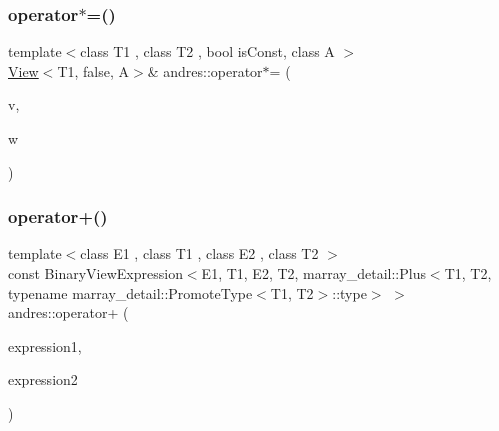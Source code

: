 \mbox{\label{namespaceandres_a766484f5dd8163c93e833b6438a49f1e}} 
\subsubsection{\texorpdfstring{operator$\ast$=()}{operator*=()}}
{\footnotesize\ttfamily template$<$class T1 , class T2 , bool is\+Const, class A $>$ \\
\hyperlink{classandres_1_1View}{View}$<$T1, false, A$>$\& andres\+::operator$\ast$= (\begin{DoxyParamCaption}\item[{\hyperlink{classandres_1_1View}{View}$<$ T1, false, A $>$ \&}]{v,  }\item[{const \hyperlink{classandres_1_1View}{View}$<$ T2, is\+Const, A $>$ \&}]{w }\end{DoxyParamCaption})\hspace{0.3cm}{\ttfamily [inline]}}

\mbox{\label{namespaceandres_a43eb4a16a1f776bc81a7f58fa93a0c71}} 
\subsubsection{\texorpdfstring{operator+()}{operator+()}\hspace{0.1cm}{\footnotesize\ttfamily [1/2]}}
{\footnotesize\ttfamily template$<$class E1 , class T1 , class E2 , class T2 $>$ \\
const Binary\+View\+Expression$<$E1, T1, E2, T2, marray\+\_\+detail\+::\+Plus$<$T1, T2, typename marray\+\_\+detail\+::\+Promote\+Type$<$T1, T2$>$\+::type$>$ $>$ andres\+::operator+ (\begin{DoxyParamCaption}\item[{const \hyperlink{classandres_1_1ViewExpression}{View\+Expression}$<$ E1, T1 $>$ \&}]{expression1,  }\item[{const \hyperlink{classandres_1_1ViewExpression}{View\+Expression}$<$ E2, T2 $>$ \&}]{expression2 }\end{DoxyParamCaption})\hspace{0.3cm}{\ttfamily [inline]}}

\mbox{\label{namespaceandres_af0a5caf93e8476b870c5f3ec31d0174d}} 
